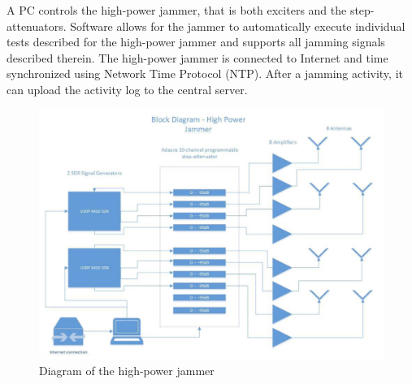 A PC controls the high-power jammer, that is both exciters and the step-attenuators. Software allows
for the jammer to automatically execute individual tests described for the high-power jammer and
supports all jamming signals described therein.
The high-power jammer is connected to Internet and time synchronized using Network Time Protocol
(NTP). After a jamming activity, it can upload the activity log to the central server.

\begin{figure}[H]
    \includegraphics[width=\textwidth]{graphics/appendixG/blockDiagramHighPowerJammer.png}
    \caption{Diagram of the high-power jammer}
    \label{fig: F8.1-1 highPowerJammer}
\end{figure}

